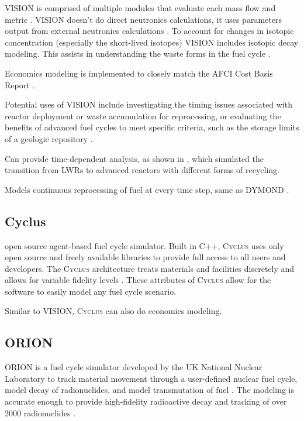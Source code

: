 \documentclass{article}
\newcommand{\Cyclus}{\textsc{Cyclus}\xspace}%
\begin{document}
    VISION is comprised of multiple modules that evaluate each mass flow and 
    metric \cite{yacout_visionverifiable_2006}. VISION doesn't do direct 
    neutronics calculations, it uses parameters output from external 
    neutronics calculations \cite{yacout_visionverifiable_2006}. To account 
    for changes in isotopic concentration (especially the short-lived 
    isotopes) VISION includes isotopic decay modeling. This assists in 
    understanding the waste forms in the fuel cycle \cite{yacout_visionverifiable_2006}.

    Economics modeling is implemented to closely match the AFCI Cost Basis 
    Report \cite{yacout_visionverifiable_2006}. 

    Potential uses of \gls{VISION} include investigating the timing issues 
    associated with reactor deployment or waste accumulation for reprocessing, 
    or evaluating the benefits of advanced fuel cycles to meet specific 
    criteria, such as the storage limits of a geologic repository 
    \cite{yacout_visionverifiable_2006}. 

    Can provide time-dependent analysis, as shown in \cite{piet_dynamic_2011}, 
    which simulated the transition from LWRs to advanced reactors with different 
    forms of recycling. 

    Models continuous reprocessing of fuel at every time step, same as DYMOND \cite{feng_standardized_2016}.



    \subsection{Cyclus}
    open source agent-based fuel cycle simulator. Built 
    in C++, \Cyclus uses only open source and freely available libraries to 
    provide full access to all users and developers. The 
    \Cyclus architecture treats materials and facilities discretely and allows 
    for variable fidelity levels \cite{huff_fundamental_2016}. These attributes
    of \Cyclus allow for the software to easily model any fuel cycle scenario.

    Similar to VISION, \Cyclus can also do economics modeling. 

    

    \subsection{ORION}
    ORION is a fuel cycle simulator developed by the UK National Nuclear 
    Laboratory to track material movement through a user-defined nuclear 
    fuel cycle, model decay of radionuclides, and model transmutation of fuel
    \cite{gregg_analysis_2012}. The modeling is accurate enough to provide 
    high-fidelity radioactive decay and tracking of over 2000 radionuclides
    \cite{feng_standardized_2016}. 
    
\end{document}

